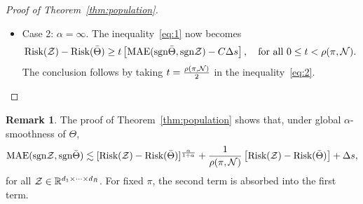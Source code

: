 \documentclass[11pt]{article}
\theoremstyle{plain}
\theoremstyle{definition}
\newtheorem{rmk}{Remark}
\def\sign{\textup{sgn}}
\def\risk{\textup{Risk}}
\begin{document}
\begin{proof}[Proof of Theorem~\ref{thm:population}]
\begin{itemize}[leftmargin=*,topsep=0pt,itemsep=-1ex,partopsep=1ex,parsep=1ex]
where $C(\pi)>0$ is a multiplicative factor independent of $\tZ$. 
\item Case 2: $\alpha=\infty$. The inequality~\eqref{eq:1} now becomes
\begin{equation}\label{eq:2}
\risk(\tZ)- \risk(\bar \Theta) \geq t\left[\textup{MAE}(\sign \bar\Theta, \sign \tZ)-C\Delta s\right], \quad \text{for all }0\leq t< \rho(\pi,\tN).
\end{equation}
The conclusion follows by taking $t={\rho(\pi, \mathcal{N})\over 2}$ in the inequality~\eqref{eq:2}. 
\end{itemize}
\end{proof}
\begin{rmk}\label{eq:rmk}The proof of Theorem~\ref{thm:population} shows that, under global $\alpha$-smoothness of $\Theta$, 
\begin{equation}\label{eq:remark}
\textup{MAE}(\sign \tZ,\sign \bar \Theta)  \lesssim [\risk(\tZ)- \risk(\bar \Theta)]^{\alpha\over 1+\alpha}+{1\over \rho(\pi, \tN)} \left[\risk(\tZ)- \risk(\bar \Theta)\right]+\Delta s,
\end{equation}
for all $\mathcal{Z}\in\mathbb{R}^{d_1\times \cdots \times d_R}$. For fixed $\pi$, the second term is absorbed into the first term. 
\end{rmk}
\end{document}
